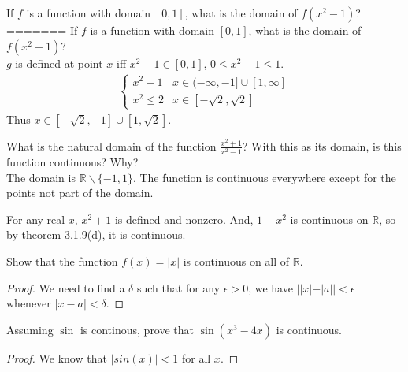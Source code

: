 \documentclass[12pt]{book}
\newcommand{\R}{\mathbb{R}}
\newenvironment{exercise}[2][Exercise]{\begin{trivlist}
\item[\hskip \labelsep {\bfseries #1}\hskip \labelsep {\bfseries #2.}]}{\end{trivlist}}
\begin{document}
\begin{exercise}{3.1.1}
If $f$ is a function with domain $[0,1]$, what is the domain of $f(x^2-1)$?\\
=======
    If $f$ is a function with domain $[0,1]$, what is the domain of $f(x^2 -1)$? \\
    
    $g$ is defined at point $x$ iff $x^2-1 \in [0,1]$, $0 \leq x^2-1 \leq 1$.
    \begin{align*}
        \begin{cases}
            x^2-1 & x\in (-\infty,-1] \cup [1,\infty] \\
            x^2 \leq 2 & x \in [-\sqrt{2},\sqrt{2}]
         \end{cases}
    \end{align*}
    Thus $x \in [-\sqrt{2},-1] \cup [1,\sqrt{2}]$.
\end{exercise}

\begin{exercise}{3.1.2}
What is the natural domain of the function $\frac{x^2 +1}{x^2-1}$? With this as its domain, is this function continuous? Why? \\

The domain is $\R \backslash \{-1,1\}$. The function is continuous everywhere except for the points not part of the domain.
\end{exercise}

\begin{exercise}{3.1.3}
For any real $x$, ${x^2+1}$ is defined and nonzero. And, $1+x^2$ is continuous on $\mathbb{R}$, so by theorem 3.1.9(d), it is continuous.
\end{exercise}

\begin{exercise}{3.1.4}
Show that the function $f(x) = |x|$ is continuous on all of $\R$.

	\begin{proof}
	We need to find a $\delta$ such that for any $\epsilon > 0$, we have $||x| - |a|| < \epsilon$ whenever $|x-a|< \delta$.
	\end{proof}
\end{exercise}

\begin{exercise}{3.1.5}
Assuming $\sin$ is continous, prove that $\sin(x^3-4x)$ is continuous.

	\begin{proof}
	We know that $|sin(x)| < 1$ for all $x$.  
	\end{proof}
\end{exercise}
\end{document}
